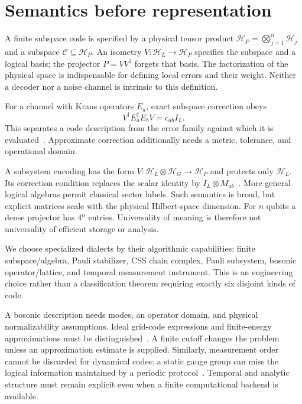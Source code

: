 \section{Semantics before representation}

A finite subspace code is specified by a physical tensor product
$\mathcal H_P=\bigotimes_{j=1}^{n}\mathcal H_j$ and a subspace
$\mathcal C\subseteq\mathcal H_P$. An isometry
$V:\mathcal H_L\to\mathcal H_P$ specifies the subspace and a logical basis;
the projector $P=VV^\dagger$ forgets that basis. The factorization of the
physical space is indispensable for defining local errors and their weight.
Neither a decoder nor a noise channel is intrinsic to this definition.

For a channel with Kraus operators $E_a$, exact subspace correction obeys
\begin{equation}
 V^\dagger E_a^\dagger E_b V=c_{ab}I_L.
\end{equation}
This separates a code description from the error family against which it
is evaluated~\cite{knill1997}. Approximate correction additionally needs a
metric, tolerance, and operational domain.

A subsystem encoding has the form
$V:\mathcal H_L\otimes\mathcal H_G\to\mathcal H_P$ and protects only
$\mathcal H_L$. Its correction condition replaces the scalar identity by
$I_L\otimes M_{ab}$~\cite{kribs2006}. More general logical algebras permit
classical sector labels. Such semantics is broad, but explicit matrices
scale with the physical Hilbert-space dimension. For $n$ qubits a dense
projector has $4^n$ entries. Universality of meaning is therefore not
universality of efficient storage or analysis.

We choose specialized dialects by their algorithmic capabilities: finite
subspace/algebra, Pauli stabilizer, CSS chain complex, Pauli subsystem,
bosonic operator/lattice, and temporal measurement instrument. This is an
engineering choice rather than a classification theorem requiring exactly
six disjoint kinds of code.

A bosonic description needs modes, an operator domain, and physical
normalizability assumptions. Ideal grid-code expressions and finite-energy
approximations must be distinguished~\cite{gkp2001}. A finite cutoff changes
the problem unless an approximation estimate is supplied. Similarly,
measurement order cannot be discarded for dynamical codes: a static gauge
group can miss the logical information maintained by a periodic
protocol~\cite{hastings2021}. Temporal and analytic structure must remain
explicit even when a finite computational backend is available.

